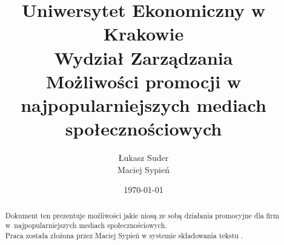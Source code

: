 \documentclass[12pt, oneside, a4paper]{article}
\title{
	\LARGE{Uniwersytet Ekonomiczny w Krakowie}\\
	\vspace{0,3cm}
	\Large{Wydział Zarządzania}\\
	\vspace{3cm}
	\Huge{Możliwości promocji w najpopularniejszych mediach społecznościowych}
	\vspace{2cm}
}
\author{Łukasz Suder\\ Maciej Sypień}
\date{\today}
\theoremstyle{plain}
\theoremstyle{definition}
\theoremstyle{remark}
\begin{document}
\nocite{*}     %

\maketitle     %

\vspace{1cm}

\begin{abstract}
Dokument ten prezentuje możliwości jakie niosą ze sobą działania promocyjne dla firm w~najpopularniejszych mediach społecznościowych.\\
Praca została złożona przez Maciej Sypień w systemie składowania tekstu \LaTeXe{}.
\end{abstract}

\clearpage

\tableofcontents     %

\clearpage








\listoffigures
\clearpage

\printbibliography
\end{document}
